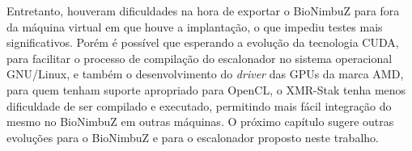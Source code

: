 Entretanto, houveram dificuldades na hora de exportar o BioNimbuZ para fora da máquina virtual em que houve a implantação, o que impediu testes mais significativos. Porém é possível que esperando a evolução da tecnologia \acrshort{CUDA}, para facilitar o processo de compilação do escalonador no sistema operacional \acrshort{GNU}/Linux, e também o desenvolvimento do \textit{driver} das \acrshort{GPU}s da marca \acrshort{AMD}, para quem tenham suporte apropriado para OpenCL, o XMR-Stak tenha menos dificuldade de ser compilado e executado, permitindo mais fácil integração do mesmo no BioNimbuZ em outras máquinas. O próximo capítulo sugere outras evoluções para o BioNimbuZ e para o escalonador proposto neste trabalho.
